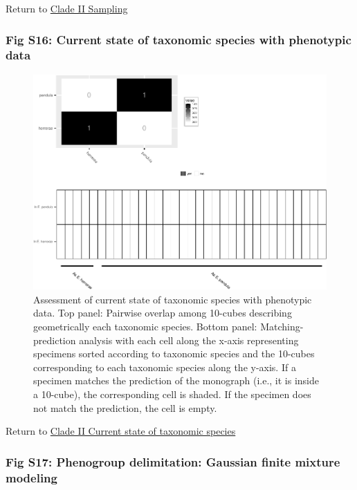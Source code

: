 \documentclass[
  11pt,
]{article}
\begin{document}
Return to \protect\hyperlink{sampling-2}{Clade II Sampling}
\pagebreak

\hypertarget{fig-s16-current-state-of-taxonomic-species-with-phenotypic-data}{%
\subsubsection{Fig S16: Current state of taxonomic species with phenotypic data}\label{fig-s16-current-state-of-taxonomic-species-with-phenotypic-data}}

\begin{figure}
\includegraphics{Supplementary_Material_files/figure-latex/currentStateOfTaxonomyCladeIIPlots-1} \caption{Assessment of current state of taxonomic species with phenotypic data. Top panel: Pairwise overlap among 10-cubes describing geometrically each taxonomic species. Bottom panel: Matching-prediction analysis with each cell along the x-axis representing specimens sorted according to taxonomic species and the 10-cubes corresponding to each taxonomic species along the y-axis. If a specimen matches the prediction of the monograph (i.e., it is inside a 10-cube), the corresponding cell is shaded. If the specimen does not match the prediction, the cell is empty.}\label{fig:currentStateOfTaxonomyCladeIIPlots}
\end{figure}

Return to \protect\hyperlink{current-state-of-taxonomic-species-1}{Clade II Current state of taxonomic species}
\pagebreak

\hypertarget{fig-s17-phenogroup-delimitation-gaussian-finite-mixture-modeling}{%
\subsubsection{Fig S17: Phenogroup delimitation: Gaussian finite mixture modeling}\label{fig-s17-phenogroup-delimitation-gaussian-finite-mixture-modeling}}
\end{document}
